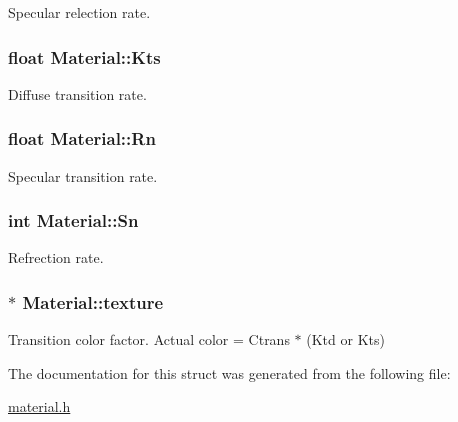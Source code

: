 Specular relection rate. 

\subsubsection[{\texorpdfstring{Kts}{Kts}}]{\setlength{\rightskip}{0pt plus 5cm}float Material\+::\+Kts}\hypertarget{structMaterial_a75cacce03b4ccb56d436cc188f75ec0f}{}\label{structMaterial_a75cacce03b4ccb56d436cc188f75ec0f}


Diffuse transition rate. 

\subsubsection[{\texorpdfstring{Rn}{Rn}}]{\setlength{\rightskip}{0pt plus 5cm}float Material\+::\+Rn}\hypertarget{structMaterial_a36c703d1fd25f5c21d9c30e8b403d849}{}\label{structMaterial_a36c703d1fd25f5c21d9c30e8b403d849}


Specular transition rate. 

\subsubsection[{\texorpdfstring{Sn}{Sn}}]{\setlength{\rightskip}{0pt plus 5cm}int Material\+::\+Sn}\hypertarget{structMaterial_aa45a0497e5baffcebbbe13d5b737f353}{}\label{structMaterial_aa45a0497e5baffcebbbe13d5b737f353}


Refrection rate. 

\subsubsection[{\texorpdfstring{texture}{texture}}]{$\ast$ Material\+::texture}\hypertarget{structMaterial_ad151148dc3460f25435e951786171350}{}\label{structMaterial_ad151148dc3460f25435e951786171350}


Transition color factor. Actual color = Ctrans $\ast$ (Ktd or Kts) 



The documentation for this struct was generated from the following file\+:\begin{DoxyCompactItemize}
\item 
\hyperlink{material_8h}{material.\+h}\end{DoxyCompactItemize}
